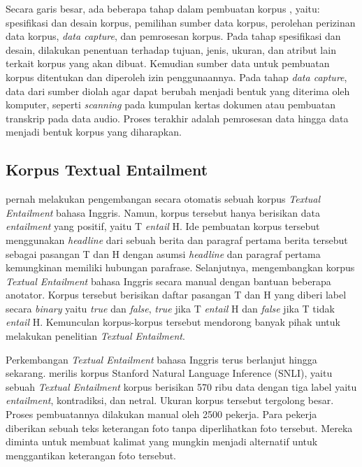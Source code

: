 	Secara garis besar, ada beberapa tahap dalam pembuatan korpus \citep{ATKINS01011992}, yaitu: spesifikasi dan desain korpus, pemilihan sumber data korpus, perolehan perizinan data korpus, \textit{data capture}, dan pemrosesan korpus. Pada tahap spesifikasi dan desain, dilakukan penentuan terhadap tujuan, jenis, ukuran, dan atribut lain terkait korpus yang akan dibuat. Kemudian sumber data untuk pembuatan korpus ditentukan dan diperoleh izin penggunaannya. Pada tahap \textit{data capture}, data dari sumber diolah agar dapat berubah menjadi bentuk yang diterima oleh komputer, seperti \textit{scanning} pada kumpulan kertas dokumen atau pembuatan transkrip pada data audio. Proses terakhir adalah pemrosesan data hingga data menjadi bentuk korpus yang diharapkan. 
	
	\subsection{Korpus Textual Entailment} 
	\cite{burgerfero} pernah melakukan pengembangan secara otomatis sebuah korpus \textit{Textual Entailment} bahasa Inggris. Namun, korpus tersebut hanya berisikan data \textit{entailment} yang positif, yaitu T \textit{entail} H. Ide pembuatan korpus tersebut menggunakan \textit{headline} dari sebuah berita dan paragraf pertama berita tersebut sebagai pasangan T dan H dengan asumsi \textit{headline} dan paragraf pertama kemungkinan memiliki hubungan parafrase. Selanjutnya, \cite{dagan2005} mengembangkan korpus \textit{Textual Entailment} bahasa Inggris secara manual dengan bantuan beberapa anotator. Korpus tersebut berisikan daftar pasangan T dan H yang diberi label secara \textit{binary} yaitu \textit{true} dan \textit{false}, \textit{true} jika T \textit{entail} H dan \textit{false} jika T tidak \textit{entail} H. Kemunculan korpus-korpus tersebut mendorong banyak pihak untuk melakukan penelitian \textit{Textual Entailment}.
	
	Perkembangan \textit{Textual Entailment} bahasa Inggris terus berlanjut hingga sekarang. \cite{snli:emnlp2015} merilis korpus Stanford Natural Language Inference (SNLI), yaitu sebuah \textit{Textual Entailment} korpus berisikan 570 ribu data dengan tiga label yaitu \textit{entailment}, kontradiksi, dan netral. Ukuran korpus tersebut tergolong besar. Proses pembuatannya dilakukan manual oleh 2500 pekerja. Para pekerja diberikan sebuah teks keterangan foto tanpa diperlihatkan foto tersebut. Mereka diminta untuk membuat kalimat yang mungkin menjadi alternatif untuk menggantikan keterangan foto tersebut.
	
